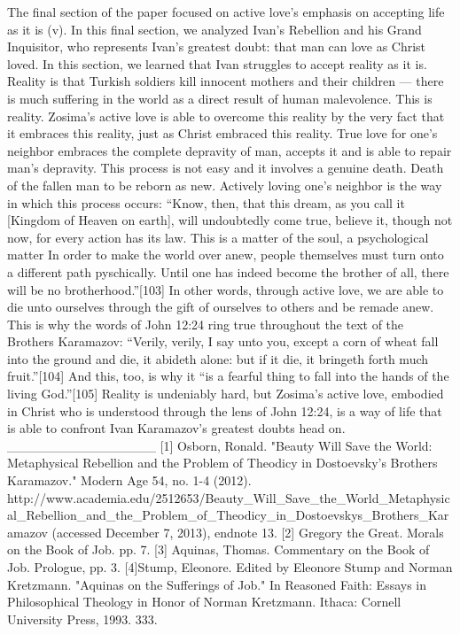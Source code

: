 The final section of the paper focused on active love’s emphasis on accepting life as it is (v). In this final section, we analyzed Ivan’s Rebellion and his Grand Inquisitor, who represents Ivan’s greatest doubt: that man can love as Christ loved. In this section, we learned that Ivan struggles to accept reality as it is. Reality is that Turkish soldiers kill innocent mothers and their children — there is much suffering in the world as a direct result of human malevolence. This is reality. Zosima’s active love is able to overcome this reality by the very fact that it embraces this reality, just as Christ embraced this reality. True love for one’s neighbor embraces the complete depravity of man, accepts it and is able to repair man’s depravity. This process is not easy and it involves a genuine death. Death of the fallen man to be reborn as new. Actively loving one’s neighbor is the way in which this process occurs: “Know, then, that this dream, as you call it [Kingdom of Heaven on earth], will undoubtedly come true, believe it, though not now, for every action has its law. This is a matter of the soul, a psychological matter In order to make the world over anew, people themselves must turn onto a different path pyschically. Until one has indeed become the brother of all, there will be no brotherhood.”[103] In other words, through active love, we are able to die unto ourselves through the gift of ourselves to others and be remade anew. This is why the words of John 12:24 ring true throughout the text of the Brothers Karamazov: “Verily, verily, I say unto you, except a corn of wheat fall into the ground and die, it abideth alone: but if it die, it bringeth forth much fruit.”[104] And this, too, is why it “is a fearful thing to fall into the hands of the living God.”[105] Reality is undeniably hard, but Zosima’s active love, embodied in Christ who is understood through the lens of John 12:24, is a way of life that is able to confront Ivan Karamazov’s greatest doubts head on.
________________
[1] Osborn, Ronald. "Beauty Will Save the World: Metaphysical Rebellion and the Problem of Theodicy in Dostoevsky's Brothers Karamazov." Modern Age 54, no. 1-4 (2012). http://www.academia.edu/2512653/Beauty_Will_Save_the_World_Metaphysical_Rebellion_and_the_Problem_of_Theodicy_in_Dostoevskys_Brothers_Karamazov (accessed December 7, 2013), endnote 13.
[2] Gregory the Great. Morals on the Book of Job. pp. 7.
[3] Aquinas, Thomas. Commentary on the Book of Job. Prologue, pp. 3.
[4]Stump, Eleonore. Edited by Eleonore Stump and Norman Kretzmann. "Aquinas on the Sufferings of Job." In Reasoned Faith: Essays in Philosophical Theology in Honor of Norman Kretzmann. Ithaca: Cornell University Press, 1993. 333.
